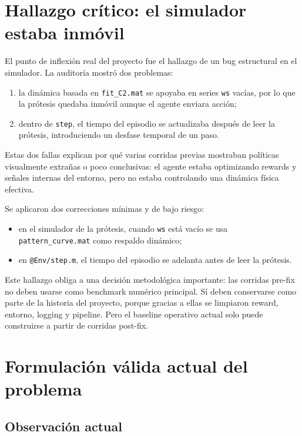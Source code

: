 \documentclass[11pt,a4paper]{article}
\begin{document}
\section{Hallazgo cr\'itico: el simulador estaba inm\'ovil}

El punto de inflexi\'on real del proyecto fue el hallazgo de un bug estructural en el simulador. La auditor\'ia mostr\'o dos problemas:
\begin{enumerate}[leftmargin=1.2cm]
    \item la din\'amica basada en \texttt{fit\_C2.mat} se apoyaba en series \texttt{ws} vac\'ias, por lo que la pr\'otesis quedaba inm\'ovil aunque el agente enviara acci\'on;
    \item dentro de \texttt{step}, el tiempo del episodio se actualizaba despu\'es de leer la pr\'otesis, introduciendo un desfase temporal de un paso.
\end{enumerate}

Estas dos fallas explican por qu\'e varias corridas previas mostraban pol\'iticas visualmente extra\~nas o poco conclusivas: el agente estaba optimizando rewards y se\~nales internas del entorno, pero no estaba controlando una din\'amica f\'isica efectiva.

Se aplicaron dos correcciones m\'inimas y de bajo riesgo:
\begin{itemize}[leftmargin=1.2cm]
    \item en el simulador de la pr\'otesis, cuando \texttt{ws} est\'a vac\'io se usa \texttt{pattern\_curve.mat} como respaldo din\'amico;
    \item en \texttt{@Env/step.m}, el tiempo del episodio se adelanta antes de leer la pr\'otesis.
\end{itemize}

Este hallazgo obliga a una decisi\'on metodol\'ogica importante: las corridas pre-fix no deben usarse como benchmark num\'erico principal. S\'i deben conservarse como parte de la historia del proyecto, porque gracias a ellas se limpiaron reward, entorno, logging y pipeline. Pero el baseline operativo actual solo puede construirse a partir de corridas post-fix.

\section{Formulaci\'on v\'alida actual del problema}

\subsection{Observaci\'on actual}
\end{document}
